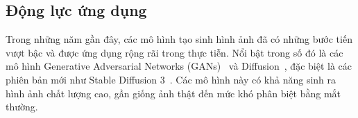 %
%

\subsection{Động lực ứng dụng}

Trong những năm gần đây, các mô hình tạo sinh hình ảnh đã có những bước tiến vượt bậc và được ứng dụng rộng rãi trong thực tiễn. Nổi bật trong số đó là các mô hình Generative Adversarial Networks (GANs)~\cite{Goodfellow2014GenerativeAN} và Diffusion~\cite{Ho2020DenoisingDP}, đặc biệt là các phiên bản mới như Stable Diffusion 3~\cite{Esser2024ScalingRF}. Các mô hình này có khả năng sinh ra hình ảnh chất lượng cao, gần giống ảnh thật đến mức khó phân biệt bằng mắt thường.

